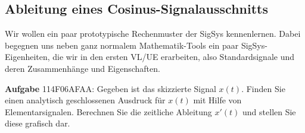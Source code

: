 \documentclass[11pt,a4paper,DIV=12]{scrartcl}
\numberwithin{equation}{section}
\numberwithin{figure}{section}
\begin{document}
\subsection{Ableitung eines Cosinus-Signalausschnitts}
\label{sec:114F06AFAA}
\begin{Ziel}
Wir wollen ein paar prototypische
Rechenmuster der SigSys kennenlernen. Dabei begegnen uns neben ganz normalem
Mathematik-Tools ein paar SigSys-Eigenheiten, die wir in den ersten VL/UE
erarbeiten, also Standardsignale und deren Zusammenhänge und Eigenschaften.
\end{Ziel}
\textbf{Aufgabe} {\tiny 114F06AFAA}:
Gegeben ist das skizzierte Signal $x(t)$. Finden Sie einen analytisch geschlossenen
Ausdruck für $x(t)$ mit Hilfe von Elementarsignalen. Berechnen Sie die zeitliche
Ableitung $x'(t)$ und stellen Sie diese grafisch dar.
\begin{center}
\end{center}
\end{document}
